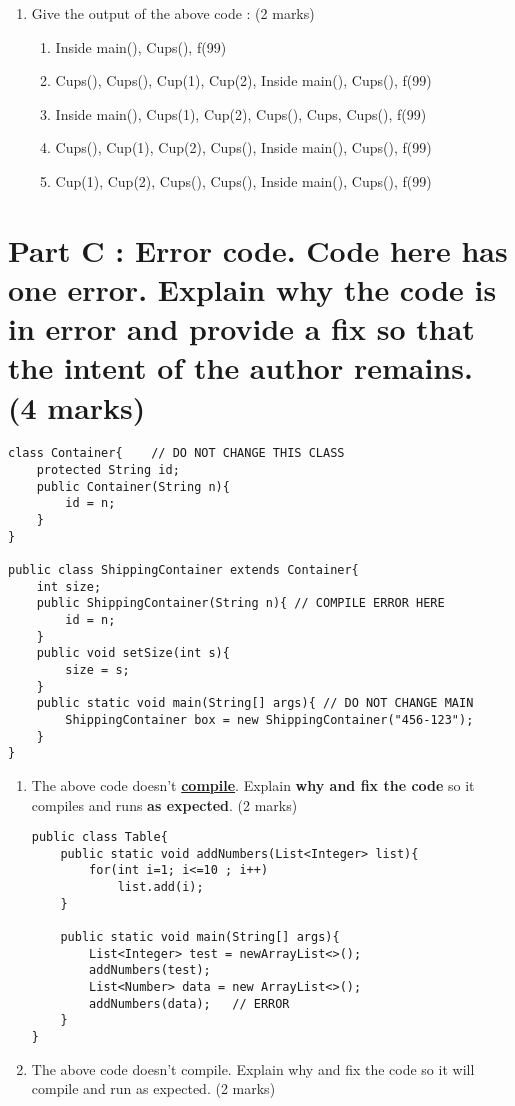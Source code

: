 \documentclass{article}
\begin{document}
\begin{enumerate}[resume]
\begin{lstlisting}
	void f(int marker){
		System.out.println("f("+marker+")");
	}
}

class Cups{
	static Cup c1 = new Cup(1);
	static Cup c2 = new Cup(2);
	
	Cups(){
		System.out.println("Cups()");
	}
}

public class ExplicitStatic{
	public static void main(String[] args){
		System.out.println("Inside main()");
		new Cups();
		Cups.c1.f(99);
	}
	static Cups x = new Cups();
	static Cups y = new Cups();
}

	\end{lstlisting}
	\item Give the output of the above code : (2 marks)
	\begin{enumerate}
		\item Inside main(), Cups(), f(99)
		\item Cups(), Cups(), Cup(1), Cup(2), Inside main(), Cups(), f(99)
		\item Inside main(), Cups(1), Cup(2), Cups(), Cups, Cups(), f(99)
		\item Cups(), Cup(1), Cup(2), Cups(), Inside main(), Cups(), f(99)
		\item Cup(1), Cup(2), Cups(), Cups(), Inside main(), Cups(), f(99)
	\end{enumerate}
\end{enumerate}
\newpage
\section{Part C : Error code. Code here has one error. Explain why the code is in error  and provide a fix so that the intent of the author remains. (4 marks)}
\begin{lstlisting}
class Container{	// DO NOT CHANGE THIS CLASS
	protected String id;
	public Container(String n){
		id = n;	
	}
}

public class ShippingContainer extends Container{
	int size;
	public ShippingContainer(String n){	// COMPILE ERROR HERE
		id = n;
	}
	public void setSize(int s){
		size = s;
	}
	public static void main(String[] args){	// DO NOT CHANGE MAIN
		ShippingContainer box = new ShippingContainer("456-123");
	}
}
\end{lstlisting}
\begin{enumerate}[resume]
	\item The above code doesn't \underline{\textbf{compile}}. Explain \textbf{why and fix the code} so it compiles and runs \textbf{as expected}. (2 marks)
	\newpage
	\begin{lstlisting}
public class Table{
	public static void addNumbers(List<Integer> list){
		for(int i=1; i<=10 ; i++)
			list.add(i);
	}
	
	public static void main(String[] args){
		List<Integer> test = newArrayList<>();
		addNumbers(test);
		List<Number> data = new ArrayList<>();
		addNumbers(data);	// ERROR
	}
}
	\end{lstlisting}
	\item The above code doesn't compile. Explain why and fix the code so it will compile and run as expected. (2 marks)
\end{enumerate}
\newpage
\end{document}

